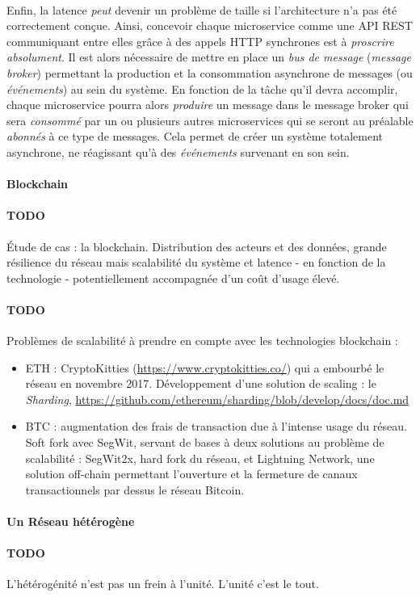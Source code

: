 \paragraph{} Enfin, la latence \emph{peut} devenir un problème de taille si l'architecture n'a pas été correctement conçue.
Ainsi, concevoir chaque microservice comme une API REST communiquant entre elles grâce à des appels HTTP synchrones est à
\emph{proscrire absolument}. Il est alors nécessaire de mettre en place un \emph{bus de message} (\emph{message broker})
permettant la production et la consommation asynchrone de messages (ou \emph{événements}) au sein du système. En fonction
de la tâche qu'il devra accomplir, chaque microservice pourra alors \emph{produire} un message dans le message broker qui
sera \emph{consommé} par un ou plusieurs autres microservices qui se seront au préalable \emph{abonnés} à ce type de messages.
Cela permet de créer un système totalement asynchrone, ne réagissant qu'à des \emph{événements} survenant en son sein.


\paragraph{Blockchain} \cite{Blockchain0} \cite{Blockchain1}

\paragraph{TODO} Étude de cas : la blockchain. Distribution des acteurs et des données, grande résilience du réseau mais scalabilité
du système et latence - en fonction de la technologie - potentiellement accompagnée d'un coût d'usage élevé.

\paragraph{TODO} Problèmes de scalabilité à prendre en compte avec les technologies blockchain :

\begin{itemize}
    \item ETH : CryptoKitties (\url{https://www.cryptokitties.co/}) qui a embourbé le réseau en novembre 2017. 
    Développement d'une solution de scaling : le \emph{Sharding}, \url{https://github.com/ethereum/sharding/blob/develop/docs/doc.md}
    \item BTC : augmentation des frais de transaction due à l'intense usage du réseau.
    Soft fork avec SegWit, servant de bases à deux solutions au problème de scalabilité : SegWit2x, hard fork du réseau,
    et Lightning Network, une solution off-chain permettant l'ouverture et la fermeture de canaux transactionnels par dessus
    le réseau Bitcoin.
\end{itemize}


\paragraph{Un Réseau hétérogène}

\paragraph{TODO} L'hétérogénité n'est pas un frein à l'unité. L'unité c'est le tout.
